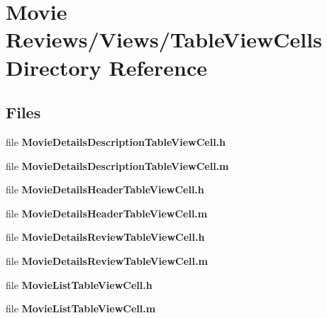 \section{Movie Reviews/\+Views/\+Table\+View\+Cells Directory Reference}
\label{dir_a7ea2d0414880151480d610955ab7791}
\subsection*{Files}
\begin{DoxyCompactItemize}
\item 
file {\bfseries Movie\+Details\+Description\+Table\+View\+Cell.\+h}
\item 
file {\bfseries Movie\+Details\+Description\+Table\+View\+Cell.\+m}
\item 
file {\bfseries Movie\+Details\+Header\+Table\+View\+Cell.\+h}
\item 
file {\bfseries Movie\+Details\+Header\+Table\+View\+Cell.\+m}
\item 
file {\bfseries Movie\+Details\+Review\+Table\+View\+Cell.\+h}
\item 
file {\bfseries Movie\+Details\+Review\+Table\+View\+Cell.\+m}
\item 
file {\bfseries Movie\+List\+Table\+View\+Cell.\+h}
\item 
file {\bfseries Movie\+List\+Table\+View\+Cell.\+m}
\end{DoxyCompactItemize}
